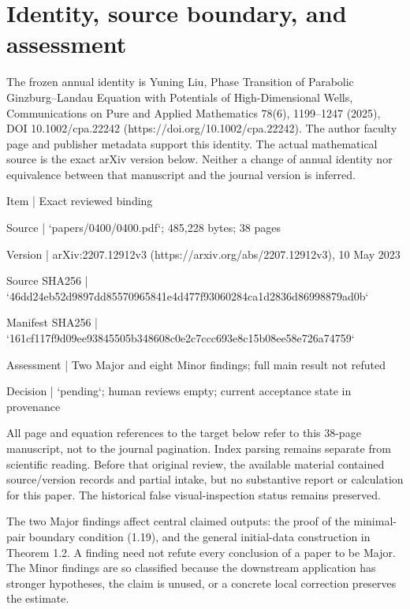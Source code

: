 \documentclass[10pt]{article}
\begin{document}
\section*{Identity, source boundary, and assessment}
The frozen annual identity is Yuning Liu, Phase Transition of Parabolic Ginzburg–Landau Equation with Potentials of High-Dimensional Wells, Communications on Pure and Applied Mathematics 78(6), 1199–1247 (2025), DOI 10.1002/cpa.22242 (https://doi.org/10.1002/cpa.22242). The author faculty page and publisher metadata support this identity. The actual mathematical source is the exact arXiv version below. Neither a change of annual identity nor equivalence between that manuscript and the journal version is inferred.\par
Item | Exact reviewed binding\par
Source | `papers/0400/0400.pdf`; 485,228 bytes; 38 pages\par
Version | arXiv:2207.12912v3 (https://arxiv.org/abs/2207.12912v3), 10 May 2023\par
Source SHA256 | `46dd24eb52d9897dd85570965841e4d477f93060284ca1d2836d86998879ad0b`\par
Manifest SHA256 | `161cf117f9d09ee93845505b348608c0e2c7ccc693e8c15b08ee58e726a74759`\par
Assessment | Two Major and eight Minor findings; full main result not refuted\par
Decision | `pending`; human reviews empty; current acceptance state in provenance\par
All page and equation references to the target below refer to this 38-page manuscript, not to the journal pagination. Index parsing remains separate from scientific reading. Before that original review, the available material contained source/version records and partial intake, but no substantive report or calculation for this paper. The historical false visual-inspection status remains preserved.\par
The two Major findings affect central claimed outputs: the proof of the minimal-pair boundary condition (1.19), and the general initial-data construction in Theorem 1.2. A finding need not refute every conclusion of a paper to be Major. The Minor findings are so classified because the downstream application has stronger hypotheses, the claim is unused, or a concrete local correction preserves the estimate.\par
\end{document}
